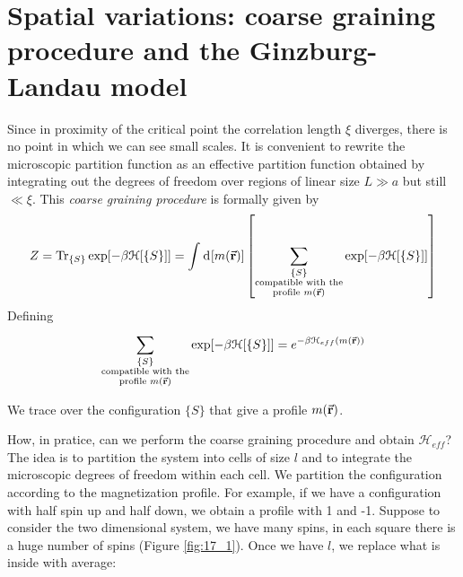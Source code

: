 \documentclass[../main/main.tex]{subfiles}
\begin{document}

\section{Spatial variations: coarse graining procedure and the Ginzburg-Landau model}

Since in proximity of the critical point the correlation length \( \xi  \) diverges, there is no point in which we can see small scales. It is convenient to rewrite the microscopic partition function as an effective partition function obtained by integrating out the degrees of freedom over regions of linear size \( L \gg a \) but still \( \ll \xi  \). This \emph{coarse graining procedure} is formally given by
\begin{equation}
  Z = \Tr_{\{ S \}  } \exp [- \beta \mathcal{H} [ \{ S \}  ]]
  = \int_{}^{} \dd[]{\qty[m(\va{r})] } \qty[\sum_{ \substack{ \{ S \} \\ \text{compatible with the} \\ \text{profile } m(\va{r})}   }^{} \exp [- \beta \mathcal{H} [ \{ S \}  ]] ]
\end{equation}
Defining
\begin{equation}
\sum_{ \substack{ \{ S \} \\ \text{compatible with the} \\ \text{profile } m(\va{r})}   }^{} \exp [- \beta \mathcal{H} [ \{ S \}  ]]
= e^{-\beta \mathcal{H}_{eff} (m (\va{r}))}
\end{equation}
\begin{remark}
We trace over the configuration \( \{ S \}   \)  that give a profile \( m(\va{r}) \).
\end{remark}

How, in pratice, can we perform the coarse graining procedure and obtain \( \mathcal{H}_{eff} \)? The idea is to partition the system into cells  of size \( l \) and to integrate the microscopic degrees of freedom within each cell.
We partition the configuration according to the magnetization profile. For example, if we have a configuration with half spin up and half down, we obtain a profile with 1 and -1.
Suppose to consider the two dimensional system, we have many spins, in each square there is a huge number of spins (Figure \ref{fig:17_1}).
Once we have \( l \), we replace what is inside with average:
\end{document}
